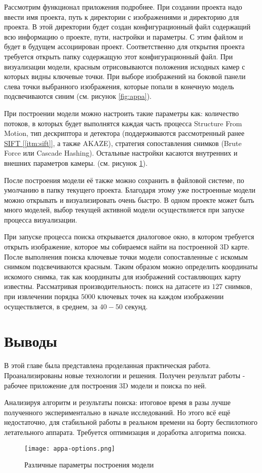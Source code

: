 \vspace{1em}
Рассмотрим функционал приложения подробнее. При создании проекта надо ввести имя проекта, путь к директории с изображениями и директорию для проекта. В этой директории будет создан конфигурационный файл содержащий всю информацию о проекте, пути, настройки и параметры. С этим файлом и будет в будущем ассоциирован проект. Соответственно для открытия проекта требуется открыть папку содержащую этот конфигурационный файл. При визуализации модели, красным отрисовываются положения исходных камер с которых видны ключевые точки. При выборе изображений на боковой панели слева точки выбранного изображения, которые попали в конечную модель подсвечиваются синим (см. рисунок \ref{fig:appa}).

При построении модели можно настроить такие параметры как: количество потоков, в которых будет выполнятся каждая часть процесса Structure From Motion, тип дескриптора и детектора (поддерживаются рассмотренный ранее \hyperref[itm:sift]{SIFT [\ref{itm:sift}]}, а также AKAZE), стратегия сопоставления снимков (Brute Force или Cascade Hashing). Остальные настройки касаются внутренних и внешних параметров камеры. (см. рисунок \ref{fig:appa-options}).

После построения модели её также можно сохранить в файловой системе, по умолчанию в папку текущего проекта. Благодаря этому уже построенные модели можно открывать и визуализировать очень быстро. В одном проекте может быть много моделей, выбор текущей активной модели осуществляется при запуске процесса визуализации.

При запуске процесса поиска открывается диалоговое окно, в котором требуется открыть изображение, которое мы собираемся найти на построенной 3D карте. После выполнения поиска ключевые точки модели сопоставленные с искомым снимком подсвечиваются красным. Таким образом можно определить координаты искомого снимка, так как координаты для изображений составляющих карту известны. Рассматривая производительность: поиск на датасете из $127$ снимков, при извлечении порядка $5000$ ключевых точек на каждом изображении осуществляется, в среднем, за $40-50$ секунд.

\section{Выводы}

В этой главе была представлена проделанная практическая работа. Проанализированы новые технологии и решения. Получен результат работы - рабочее приложение для построения 3D модели и поиска по ней.

Анализируя алгоритм и результаты поиска: итоговое время в разы лучше полученного экспериментально в начале исследований. Но этого всё ещё недостаточно, для стабильной работы в реальном времени на борту беспилотного летательного аппарата. Требуется оптимизация и доработка алгоритма поиска.

\begin{figure}[h]
    \centering
    \texttt{[image: appa-options.png]}
    \caption{Различные параметры построения модели}
    \label{fig:appa-options}
\end{figure}
